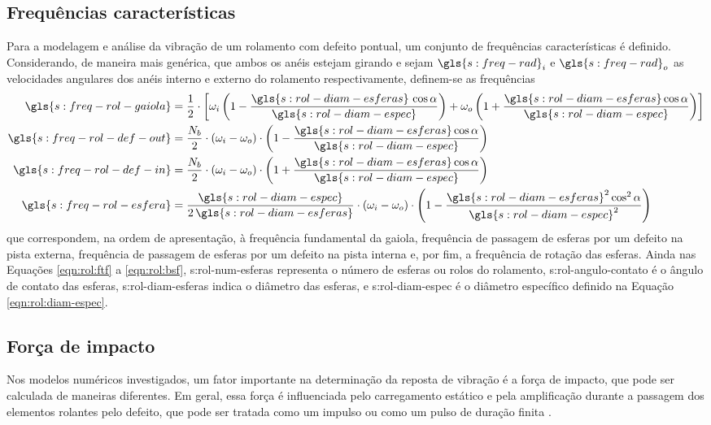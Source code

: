 \documentclass[12pt,oneside,english,brazil,lmodern,siglas,simbolos,cite=num]{ucsmonograph}
\begin{document}
	\subsection{Frequências características}
	Para a modelagem e análise da vibração de um rolamento com defeito pontual, um conjunto de frequências características é definido.
	Considerando, de maneira mais genérica, que ambos os anéis estejam girando e sejam $ \gls{s:freq-rad}_i $ e $ \gls{s:freq-rad}_o $ as velocidades angulares dos anéis interno e externo do rolamento respectivamente, definem-se as frequências \cite{sassi:2007}
	\begin{align}
		\gls{s:freq-rol-gaiola} &= \frac{1}{2}\cdot\left[ \omega_i\left(1-\frac{\gls{s:rol-diam-esferas}\,\cos\alpha}{\gls{s:rol-diam-espec}} \right) + \omega_o\left(1+\frac{\gls{s:rol-diam-esferas}\cos\alpha}{\gls{s:rol-diam-espec}} \right) \right] \label{eqn:rol:ftf}\\
		\gls{s:freq-rol-def-out} &= \frac{N_b}{2}\cdot(\omega_i-\omega_o)\cdot\left(1-\frac{\gls{s:rol-diam-esferas}\cos\alpha}{\gls{s:rol-diam-espec}} \right) \label{eqn:rol:bpfo}\\
		\gls{s:freq-rol-def-in} &= \frac{N_b}{2}\cdot(\omega_i-\omega_o)\cdot\left(1+\frac{\gls{s:rol-diam-esferas}\cos\alpha}{\gls{s:rol-diam-espec}} \right) \label{eqn:rol:bpfi}\\
		\gls{s:freq-rol-esfera} &= \frac{\gls{s:rol-diam-espec}}{2\,\gls{s:rol-diam-esferas}}\cdot(\omega_i-\omega_o)\cdot\left(1-\frac{\gls{s:rol-diam-esferas}^2\cos^2\alpha}{\gls{s:rol-diam-espec}^2} \right) \label{eqn:rol:bsf}
	\end{align}
	que correspondem, na ordem de apresentação, à frequência fundamental da gaiola, frequência de passagem de esferas por um defeito na pista externa, frequência de passagem de esferas por um defeito na pista interna e, por fim, a frequência de rotação das esferas.
	Ainda nas Equações \ref{eqn:rol:ftf} a \ref{eqn:rol:bsf}, \gls{s:rol-num-esferas} representa o número de esferas ou rolos do rolamento, \gls{s:rol-angulo-contato} é o ângulo de contato das esferas, \gls{s:rol-diam-esferas} indica o diâmetro das esferas, e \gls{s:rol-diam-espec} é o diâmetro específico definido na Equação \ref{eqn:rol:diam-espec}.
	
	\subsection{Força de impacto}
	Nos modelos numéricos investigados, um fator importante na determinação da reposta de vibração é a força de impacto, que pode ser calculada de maneiras diferentes.
	Em geral, essa força é influenciada pelo carregamento estático e pela amplificação durante a passagem dos elementos rolantes pelo defeito, que pode ser tratada como um impulso \cite{mcfadden:1984,sassi:2007,cong:2013} ou como um pulso de duração finita \cite{tandon:1997}.
	
\end{document}
